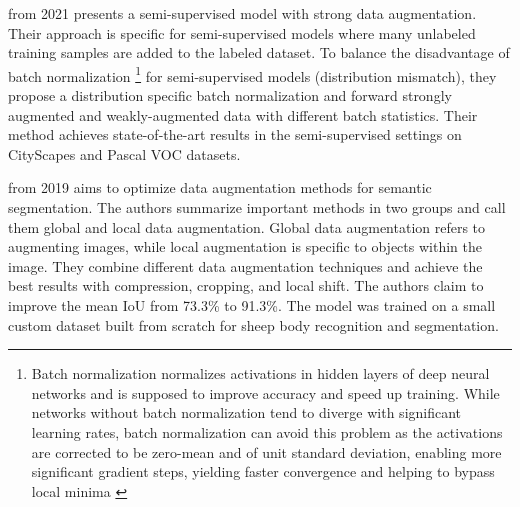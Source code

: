  \cite{Yuan_2021_ICCV} from 2021 presents a semi-supervised model with strong data augmentation. Their approach is specific for semi-supervised models where many unlabeled training samples are added to the labeled dataset. To balance the disadvantage of batch normalization \footnote{Batch normalization normalizes activations in hidden layers of deep neural networks and is supposed to improve accuracy and speed up training. While networks without batch normalization tend to diverge with significant learning rates, batch normalization can avoid this problem as the activations are corrected to be zero-mean and of unit standard deviation, enabling more significant gradient steps, yielding faster convergence and helping to bypass local minima \cite{NEURIPS2018_36072923}} for semi-supervised models (distribution mismatch), they propose a distribution specific batch normalization and forward strongly augmented and weakly-augmented data with different batch statistics. Their method achieves state-of-the-art results in the semi-supervised settings on CityScapes \cite{cordts2016cityscapes} and Pascal VOC \cite{hoiem2009pascal} datasets.

 \cite{10.1145/3341016.3341020} from 2019 aims to optimize data augmentation methods for semantic segmentation. The authors summarize important methods in two groups and call them global and local data augmentation. Global data augmentation refers to augmenting images, while local augmentation is specific to objects within the image. They combine different data augmentation techniques and achieve the best results with compression, cropping, and local shift. The authors claim to improve the mean \ac{IoU} from 73.3\% to 91.3\%. The model was trained on a small custom dataset built from scratch for sheep body recognition and segmentation.


